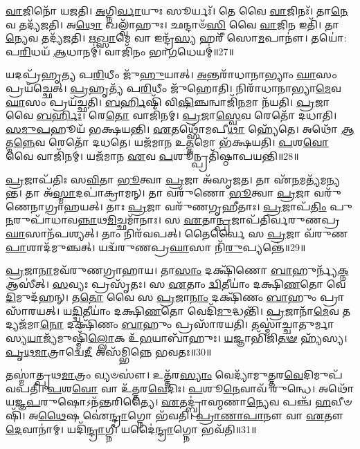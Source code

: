 \-\ul{𑌵𑌾}\-𑌜𑌿𑌨𑍋᳴ 𑌯𑌜𑌤𑌿।
\-\ul{𑌅}\-𑌗𑍍𑌨𑌿\-\ul{𑌰𑍍𑌵𑌾}\-𑌯𑍁𑌃 𑌸𑍂𑌰𑍍𑌯𑌃᳴।
𑌤𑍇 𑌵𑍈 \ul{𑌵𑌾}\-𑌜𑌿𑌨𑌃᳴।
𑌤𑌾\-\ul{𑌨𑍇}\-𑌵 𑌤𑌦𑍍𑌯᳴𑌜𑌤𑌿।
𑌅\-\ul{𑌥𑍋} 𑌖𑌲𑍍𑌵𑌾᳴𑌹𑍁𑌃।
𑌛𑌨𑍍𑌦𑌾𑍞᳴\-\ul{𑌸𑌿} 𑌵𑍈 \ul{𑌵𑌾}\-𑌜𑌿\-\ul{𑌨} 𑌇𑌤𑌿᳴।
𑌤𑌾\-\ul{𑌨𑍍𑌯𑍇}\-𑌵 𑌤𑌦𑍍𑌯᳴𑌜𑌤𑌿।
\-\ul{𑌋}\-\-\ul{𑌖𑍍𑌸𑌾}\-𑌮𑍇 𑌵𑌾 𑌇𑌨𑍍𑌦𑍍𑌰᳴\-\ul{𑌸𑍍𑌯} 𑌹𑌰𑍀᳴ 𑌸𑍋\-\ul{𑌮}\-𑌪𑌾𑌨𑍗॑।
𑌤𑌯𑍋॑: 𑌪\-\ul{𑌰𑌿}\-𑌧𑌯᳴ \ul{𑌆}\-𑌧𑌾𑌨𑌮𑍍॑।
𑌵𑌾𑌜𑌿᳴𑌨𑌂 𑌭𑌾\-\ul{𑌗}\-𑌧𑍇𑌯𑌮𑍍॑॥27॥

𑌯𑌦𑌪𑍍𑌰᳴𑌹𑍃𑌤𑍍𑌯 𑌪\-\ul{𑌰𑌿}\-𑌧𑍀𑌂 𑌜𑍁᳴\-\ul{𑌹𑍁}\-𑌯𑌾𑌤𑍍।
\-\ul{𑌅}\-𑌨𑍍𑌤𑌰𑌾᳴𑌧𑌾𑌨𑌾𑌭𑍍𑌯𑌾𑌂 \ul{𑌘𑌾}\-𑌸𑌂 𑌪𑍍𑌰𑌯᳴𑌚𑍍𑌛𑍇𑌤𑍍।
\-\ul{𑌪𑍍𑌰}\-𑌹𑍃𑌤𑍍𑌯᳴ 𑌪\-\ul{𑌰𑌿}\-𑌧𑍀𑌂 𑌜𑍁᳴𑌹𑍋𑌤𑌿।
𑌨𑌿𑌰𑌾᳴𑌧𑌾𑌨𑌾𑌭𑍍𑌯𑌾\-\ul{𑌮𑍇}\-𑌵 \ul{𑌘𑌾}\-𑌸𑌂 𑌪𑍍𑌰𑌯᳴𑌚𑍍𑌛𑌤𑌿।
\-\ul{𑌬}\-\-\ul{𑌰𑍍}\-𑌹𑌿𑌷𑌿᳴ 𑌵𑌿\-\ul{𑌷𑌿}\-𑌞𑍍𑌚𑌨𑍍𑌵𑌾𑌜𑌿᳴\-\ul{𑌨}\-𑌮𑌾 𑌨᳴𑌯𑌤𑌿।
\-\ul{𑌪𑍍𑌰}\-𑌜𑌾 𑌵𑍈 \ul{𑌬}\-\-\ul{𑌰𑍍}\-𑌹𑌿𑌃।
𑌰𑍇\-\ul{𑌤𑍋} 𑌵𑌾𑌜𑌿᳴𑌨𑌮𑍍।
\-\ul{𑌪𑍍𑌰}\-𑌜𑌾\-\ul{𑌸𑍍𑌵𑍇}\-𑌵 𑌰𑍇𑌤𑍋᳴ 𑌦𑌧𑌾𑌤𑌿।
\-\ul{𑌸}\-\-\ul{𑌮𑍁}\-\-\ul{𑌪}\-𑌹𑍂𑌯᳴ 𑌭𑌕𑍍𑌷𑌯𑌨𑍍𑌤𑌿।
\-\ul{𑌏}\-𑌤𑌥𑍍𑌸𑍋᳴𑌮𑌪𑍀\-\ul{𑌥𑌾} 𑌹𑍍𑌯𑍇᳴𑌤𑍇।
𑌅𑌥𑍋᳴ \ul{𑌆}\-𑌤𑍍𑌮\-\ul{𑌨𑍍𑌨𑍇}\-𑌵 𑌰𑍇𑌤𑍋᳴ 𑌦𑌧𑌤𑍇।
𑌯𑌜᳴𑌮𑌾𑌨 𑌉\-\ul{𑌤𑍍𑌤}\-𑌮𑍋 𑌭᳴𑌕𑍍𑌷𑌯𑌤𑌿।
\-\ul{𑌪}\-𑌶\-\ul{𑌵𑍋} 𑌵𑍈 𑌵𑌾𑌜𑌿᳴𑌨𑌮𑍍।
𑌯𑌜᳴𑌮𑌾𑌨 \ul{𑌏}\-𑌵 \ul{𑌪}\-𑌶𑍂𑌨𑍍𑌪𑍍𑌰𑌤𑌿᳴\-𑌷𑍍𑌠𑌾𑌪𑌯𑌨𑍍𑌤𑌿॥28॥\anuvakamend[\-\ul{𑌲𑍋}\-𑌕𑍋 𑌬᳴𑌹𑍁\-\ul{𑌰𑍂}\-𑌪𑌂 𑌭᳴\-\ul{𑌵}\-𑌤𑍍𑌯𑌾𑌜𑍍𑌯᳴𑌭𑌾𑌗𑍗 \ul{𑌪}\-𑌶\-\ul{𑌵} 𑌆𑌜𑍍𑌯᳴𑌮\-\ul{𑌵}\-𑌦𑍍𑌯𑍇𑌦𑌾᳴𑌹\-\ul{𑌵}\-𑌨𑍀𑌯𑌃᳴ \ul{𑌪𑍍𑌰}\-𑌤𑍍𑌯𑌕𑍍𑌤\-\ul{𑌸𑍍𑌮𑌾}\-𑌤𑍍𑌪𑍍𑌰𑌤𑌿᳴\-𑌷𑍍𑌠𑌿𑌤𑍋 𑌹𑍋\-\ul{𑌤}\-𑌵𑍍𑌯𑍋᳴ 𑌭𑌾\-\ul{𑌗}\-𑌧𑍇𑌯᳴\-\ul{𑌮𑍇}\-𑌤𑍇 \ul{𑌚}\-𑌤𑍍𑌵𑌾𑌰𑌿᳴ 𑌚]

\-\ul{𑌪𑍍𑌰}\-𑌜𑌾\-𑌪᳴𑌤𑌿𑌃 𑌸\-\ul{𑌵𑌿}\-𑌤𑌾 \ul{𑌭𑍂}\-𑌤𑍍𑌵𑌾 \ul{𑌪𑍍𑌰}\-𑌜𑌾 𑌅᳴\-𑌸𑍃𑌜𑌤।
𑌤𑌾 𑌏᳴\-\ul{𑌨}\-𑌮𑌤𑍍𑌯᳴𑌮𑌨𑍍𑌯𑌨𑍍𑌤।
𑌤𑌾 𑌅᳴\-\ul{𑌸𑍍𑌮𑌾}\-𑌦𑌪𑌾॑𑌕𑍍𑌰𑌾𑌮𑌨𑍍।
𑌤𑌾 𑌵𑌰𑍁᳴𑌣𑍋 \ul{𑌭𑍂}\-𑌤𑍍𑌵𑌾 \ul{𑌪𑍍𑌰}\-𑌜𑌾 𑌵𑌰𑍁᳴𑌣𑍇𑌨𑌾𑌗𑍍𑌰𑌾𑌹𑌯𑌤𑍍।
𑌤𑌾𑌃 \ul{𑌪𑍍𑌰}\-𑌜𑌾 𑌵𑌰𑍁᳴𑌣𑌗𑍃𑌹𑍀𑌤𑌾𑌃।
\-\ul{𑌪𑍍𑌰}\-𑌜𑌾𑌪᳴\-\ul{𑌤𑌿𑌂} 𑌪𑍁\-\ul{𑌨}\-𑌰𑍁𑌪𑌾᳴𑌧𑌾𑌵\-\ul{𑌨𑍍𑌨𑌾}\-𑌥\-\ul{𑌮𑌿}\-𑌚𑍍𑌛𑌮𑌾᳴𑌨𑌾𑌃।
𑌸 \ul{𑌏}\-𑌤𑌾\-\ul{𑌨𑍍𑌪𑍍𑌰}\-𑌜𑌾𑌪᳴𑌤𑌿𑌰𑍍𑌵𑌰𑍁𑌣\-𑌪𑍍𑌰\-\ul{𑌘𑌾}\-𑌸𑌾𑌨᳴𑌪𑌶𑍍𑌯𑌤𑍍।
𑌤𑌾𑌂 𑌨𑌿𑌰᳴𑌵𑌪𑌤𑍍।
𑌤𑍈𑌰𑍍𑌵𑍈 𑌸 \ul{𑌪𑍍𑌰}\-𑌜𑌾 𑌵᳴𑌰𑍁𑌣\-\ul{𑌪𑌾}\-𑌶𑌾𑌦᳴𑌮𑍁𑌞𑍍𑌚𑌤𑍍।
𑌯𑌦𑍍𑌵᳴𑌰𑍁𑌣𑌪𑍍𑌰\-\ul{𑌘𑌾}\-𑌸𑌾 𑌨𑌿᳴\-\ul{𑌰𑍁}\-𑌪𑍍𑌯𑌨𑍍𑌤𑍇॑॥29॥

\-\ul{𑌪𑍍𑌰}\-𑌜𑌾\-\ul{𑌨𑌾}\-𑌮𑌵᳴𑌰𑍁𑌣𑌗𑍍𑌰𑌾𑌹𑌾𑌯।
𑌤𑌾\-\ul{𑌸𑌾𑌂} 𑌦𑌕𑍍𑌷𑌿᳴𑌣𑍋 \ul{𑌬𑌾}\-𑌹𑍁𑌰𑍍𑌨𑍍𑌯᳴\-\ul{𑌕𑍍𑌨} 𑌆𑌸𑍀॑𑌤𑍍।
\-\ul{𑌸}\-𑌵𑍍𑌯𑌃 𑌪𑍍𑌰𑌸𑍃᳴𑌤𑌃।
𑌸 \ul{𑌏}\-𑌤𑌾𑌂 \ul{𑌦𑍍𑌵𑌿}\-𑌤𑍀𑌯𑌾𑌂॑ 𑌦𑌕𑍍𑌷𑌿\-\ul{𑌣}\-𑌤𑍋 𑌵𑍇\-\ul{𑌦𑌿}\-𑌮𑍁𑌦᳴𑌹𑌨𑍍।
𑌤\-\ul{𑌤𑍋} 𑌵𑍈 𑌸 \ul{𑌪𑍍𑌰}\-𑌜𑌾\-\ul{𑌨𑌾𑌂} 𑌦𑌕𑍍𑌷𑌿᳴𑌣𑌂 \ul{𑌬𑌾}\-𑌹𑍁𑌂 𑌪𑍍𑌰𑌾𑌸𑌾᳴𑌰𑌯𑌤𑍍।
𑌯\-\ul{𑌦𑍍𑌦𑍍𑌵𑌿}\-𑌤𑍀𑌯𑌾𑌂॑ 𑌦𑌕𑍍𑌷𑌿\-\ul{𑌣}\-𑌤𑍋 𑌵𑍇𑌦𑌿᳴\-\ul{𑌮𑍁}\-𑌦𑍍𑌧𑌨𑍍𑌤𑌿᳴।
\-\ul{𑌪𑍍𑌰}\-𑌜𑌾𑌨𑌾᳴\-\ul{𑌮𑍇}\-𑌵 𑌤𑌦𑍍𑌯𑌜᳴𑌮𑌾\-\ul{𑌨𑍋} 𑌦𑌕𑍍𑌷𑌿᳴𑌣𑌂 \ul{𑌬𑌾}\-𑌹𑍁𑌂 𑌪𑍍𑌰𑌸𑌾᳴𑌰𑌯𑌤𑌿।
𑌤𑌸𑍍𑌮𑌾॑𑌚𑍍𑌚𑌾𑌤𑍁𑌰𑍍𑌮𑌾𑌸𑍍𑌯\-\ul{𑌯𑌾}\-𑌜𑍍𑌯᳴𑌮𑍁𑌷𑍍𑌮𑌿𑌁᳴\-\ul{𑌲𑍍𑌲𑍋}\-𑌕 𑌉᳴\-\ul{𑌭}\-𑌯𑌾𑌬𑌾᳴𑌹𑍁𑌃।
\-\ul{𑌯}\-𑌜𑍍𑌞𑌾𑌭𑌿᳴𑌜𑌿\-\ul{𑌤}\-\-\ul{𑍟} 𑌹𑍍𑌯᳴𑌸𑍍𑌯।
\-\ul{𑌪𑍃}\-\-\ul{𑌥}\-\-\ul{𑌮𑌾}\-𑌤𑍍𑌰𑌾𑌦𑍍𑌵𑍇\-\ul{𑌦𑍀} 𑌅𑌸᳴𑌮𑍍𑌭𑌿𑌨𑍍𑌨𑍇 𑌭𑌵𑌤𑌃॥30॥

𑌤𑌸𑍍𑌮𑌾॑𑌤𑍍𑌪𑍃𑌥\-\ul{𑌮𑌾}\-𑌤𑍍𑌰𑌂 𑌵𑍍𑌯𑍞𑌸𑍗॑।
𑌉𑌤𑍍𑌤᳴𑌰\-\ul{𑌸𑍍𑌯𑌾𑌂} 𑌵𑍇𑌦𑍍𑌯𑌾᳴𑌮𑍁𑌤𑍍𑌤𑌰\-\ul{𑌵𑍇}\-𑌦𑌿𑌮𑍁𑌪᳴ 𑌵𑌪𑌤𑌿।
\-\ul{𑌪}\-𑌶\-\ul{𑌵𑍋} 𑌵𑌾 𑌉᳴𑌤𑍍𑌤𑌰\-\ul{𑌵𑍇}\-𑌦𑌿𑌃।
\-\ul{𑌪}\-𑌶𑍂\-\ul{𑌨𑍇}\-𑌵𑌾𑌵᳴ 𑌰𑍁𑌨𑍍𑌧𑍇।
𑌅𑌥𑍋᳴ 𑌯𑌜𑍍𑌞\-\ul{𑌪}\-𑌰𑍁𑌷𑍋\-𑌽𑌨᳴𑌨𑍍𑌤𑌰𑌿𑌤𑍍𑌯𑍈।
\-\ul{𑌏}\-𑌤𑌦𑍍𑌬𑍍𑌰𑌾॑𑌹𑍍𑌮𑌣𑌾\-\ul{𑌨𑍍𑌯𑍇}\-𑌵 𑌪𑌞𑍍𑌚᳴ \ul{𑌹}\-𑌵𑍀𑍞𑌷𑌿᳴।
𑌅\-\ul{𑌥𑍈}\-𑌷 𑌐॑\-\ul{𑌨𑍍𑌦𑍍𑌰𑌾}\-𑌗𑍍𑌨𑍋 𑌭᳴𑌵𑌤𑌿।
\-\ul{𑌪𑍍𑌰𑌾}\-\-\ul{𑌣𑌾}\-\-\ul{𑌪𑌾}\-𑌨𑍗 𑌵𑌾 \ul{𑌏}\-𑌤𑍗 \ul{𑌦𑍇}\-𑌵𑌾𑌨𑌾॑𑌮𑍍।
𑌯𑌦𑌿᳴\-\ul{𑌨𑍍𑌦𑍍𑌰𑌾}\-𑌗𑍍𑌨𑍀।
𑌯𑌦𑍈॑\-\ul{𑌨𑍍𑌦𑍍𑌰𑌾}\-𑌗𑍍𑌨𑍋 𑌭𑌵᳴𑌤𑌿॥31॥

